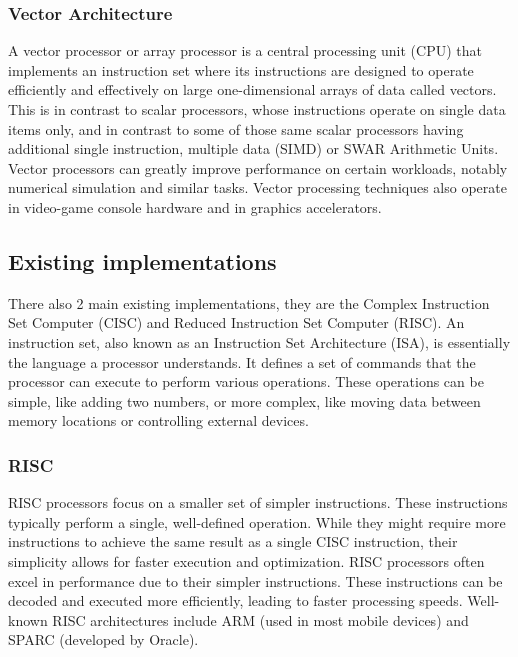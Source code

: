 \documentclass[9pt,a4paper,twoside]{tau}
\begin{document}
        \subsubsection{Vector Architecture}
        A vector processor or array processor is a central processing unit (CPU) that implements an instruction set where its instructions are designed to operate efficiently and effectively on large one-dimensional arrays of data called vectors. This is in contrast to scalar processors, whose instructions operate on single data items only, and in contrast to some of those same scalar processors having additional single instruction, multiple data (SIMD) or SWAR Arithmetic Units. Vector processors can greatly improve performance on certain workloads, notably numerical simulation and similar tasks. Vector processing techniques also operate in video-game console hardware and in graphics accelerators.
        




    
    \subsection{Existing implementations}
    There also 2 main existing implementations, they are the Complex Instruction Set Computer (CISC) and Reduced Instruction Set Computer (RISC). An instruction set, also known as an Instruction Set Architecture (ISA), is essentially the language a processor understands. It defines a set of commands that the processor can execute to perform various operations. These operations can be simple, like adding two numbers, or more complex, like moving data between memory locations or controlling external devices.

        \subsubsection{RISC}
        RISC processors focus on a smaller set of simpler instructions. These instructions typically perform a single, well-defined operation. While they might require more instructions to achieve the same result as a single CISC instruction, their simplicity allows for faster execution and optimization. RISC processors often excel in performance due to their simpler instructions. These instructions can be decoded and executed more efficiently, leading to faster processing speeds.
        Well-known RISC architectures include ARM (used in most mobile devices) and SPARC (developed by Oracle).
\end{document}
